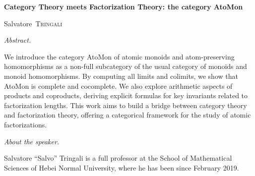 \documentclass[a4paper,10pt]{amsart}
\begin{document}
                                
	
		
\thispagestyle{empty}    
	
	
\begin{center}
	\textbf{\Large{Category Theory meets Factorization Theory: the category \textsf{AtoMon}}}
\end{center}


\vskip 0.2cm
	
	

\begin{center}
	Salvatore~\textsc{Tringali} %
\end{center}

\vskip 0.8cm
	
	
	

\textit{Abstract.} %

We introduce the category \textsf{AtoMon} of atomic monoids 
and atom-preserving homomorphisms as a non-full subcategory of the usual category 
of monoids and monoid homomorphisms. By computing all limits and colimits, we show 
that \textsf{AtoMon} is complete and cocomplete. We also explore arithmetic aspects 
of products and coproducts, deriving explicit formulas for key invariants related 
to factorization lengths. This work aims to build a bridge between category theory 
and factorization theory, offering a categorical framework for the study of atomic 
factorizations.



\vskip 0.5cm


\textit{About the speaker.} %

Salvatore ``Salvo'' Tringali is a full professor at the School of Mathematical 
Sciences of Hebei Normal University, where he has been since February 2019.
\end{document}
